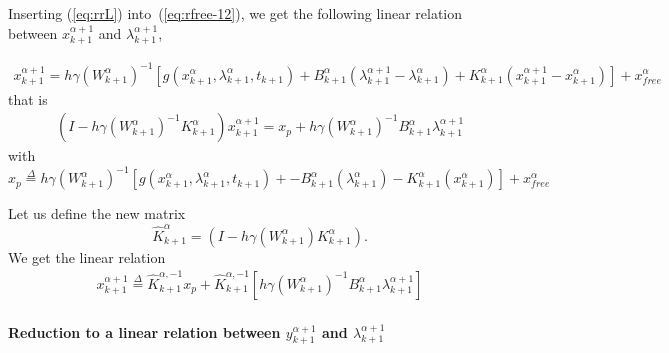 Inserting (\ref{eq:rrL}) into~(\ref{eq:rfree-12}), we get the following linear relation between $x^{\alpha+1}_{k+1}$ and
$\lambda^{\alpha+1}_{k+1}$, 

\begin{equation}
   \begin{array}{l}
     x^{\alpha+1}_{k+1} = h\gamma(W^{\alpha}_{k+1} )^{-1}\left[g(x^{\alpha}_{k+1},\lambda^{\alpha}_{k+1},t_{k+1}) +
    B^{\alpha}_{k+1} (\lambda^{\alpha+1}_{k+1} - \lambda^{\alpha}_{k+1})+K^{\alpha}_{k+1}
    (x^{\alpha+1}_{k+1} - x^{\alpha}_{k+1}) \right ] +x^\alpha_{free}
\end{array}
\end{equation}
that is 
\begin{equation}
  \begin{array}{l}
    (I-h \gamma (W^{\alpha}_{k+1})^{-1}K^{\alpha}_{k+1})x^{\alpha+1}_{k+1}=x_p + h \gamma (W^{\alpha}_{k+1})^{-1}    B^{\alpha}_{k+1} \lambda^{\alpha+1}_{k+1}
   \end{array}
\end{equation}
with 
\begin{equation}
  \boxed{x_p \stackrel{\Delta}{=}  h\gamma(W^{\alpha}_{k+1} )^{-1}\left[g(x^{\alpha}_{k+1},\lambda^{\alpha}_{k+1},t_{k+1}) +
    -B^{\alpha}_{k+1} (\lambda^{\alpha}_{k+1})-K^{\alpha}_{k+1} (x^{\alpha}_{k+1}) \right ] +x^\alpha_{free}}
\end{equation}



Let us  define the new matrix
\begin{equation}
\hat K^{\alpha}_{k+1}=(I-h \gamma (W^{\alpha}_{k+1})K^{\alpha}_{k+1}).
\label{eq:hatW}
\end{equation}
We get the linear relation
\begin{equation}
  \label{eq:rfree-13}
  \begin{array}{l}
 \boxed{   x^{\alpha+1}_{k+1}\stackrel{\Delta}{=} \hat K^{\alpha,-1}_{k+1} x_p + \hat K^{\alpha,-1}_{k+1} \left[ h \gamma (W^{\alpha}_{k+1})^{-1}    B^{\alpha}_{k+1} \lambda^{\alpha+1}_{k+1}\right]}
   \end{array}
\end{equation}



\paragraph{Reduction to a linear relation between  $y^{\alpha+1}_{k+1}$ and
$\lambda^{\alpha+1}_{k+1}$}

